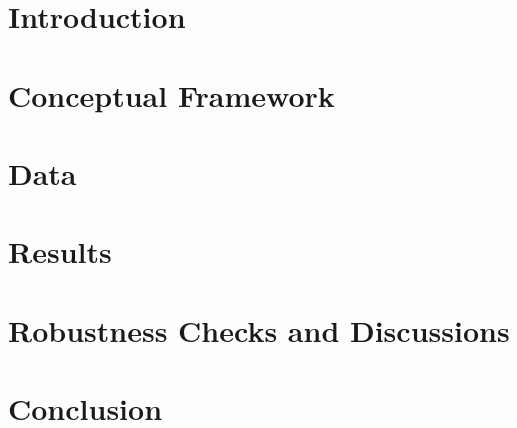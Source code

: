 
\section{Introduction}\label{sec:intro}

\section{Conceptual Framework}\label{sec:model}

\section{Data}\label{sec:data}

\section{Results}\label{sec:results}

\section{Robustness Checks and Discussions} %
\label{sec:robcheck}

\section{Conclusion}\label{sec:conc}
